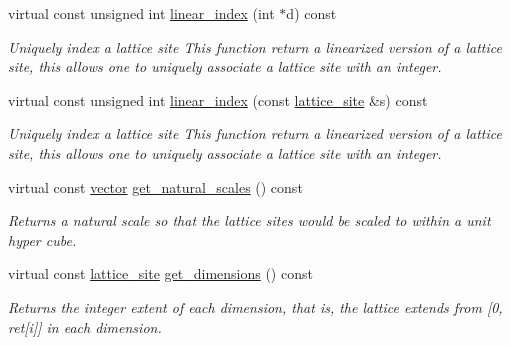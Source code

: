 \begin{DoxyCompactItemize}
\mbox{\label{classsisl_1_1cartesian__planar_a4ef0287f2ed519a497615049c3e564bf}} 
virtual const unsigned int \hyperlink{classsisl_1_1cartesian__planar_a4ef0287f2ed519a497615049c3e564bf}{linear\+\_\+index} (int $\ast$d) const
\begin{DoxyCompactList}\small\item\em Uniquely index a lattice site This function return a linearized version of a lattice site, this allows one to uniquely associate a lattice site with an integer. \end{DoxyCompactList}\item 
\mbox{\label{classsisl_1_1cartesian__planar_ae96d9421f8640e2fee5d269e9ef40db1}} 
virtual const unsigned int \hyperlink{classsisl_1_1cartesian__planar_ae96d9421f8640e2fee5d269e9ef40db1}{linear\+\_\+index} (const \hyperlink{namespacesisl_acd18feee4026583db6185df2b25434aa}{lattice\+\_\+site} \&s) const
\begin{DoxyCompactList}\small\item\em Uniquely index a lattice site This function return a linearized version of a lattice site, this allows one to uniquely associate a lattice site with an integer. \end{DoxyCompactList}\item 
\mbox{\label{classsisl_1_1cartesian__planar_a352301fc39d8766ff2705879828b4dd4}} 
virtual const \hyperlink{namespacesisl_a2069bd5374a9be042ff3ce3306d41e1a}{vector} \hyperlink{classsisl_1_1cartesian__planar_a352301fc39d8766ff2705879828b4dd4}{get\+\_\+natural\+\_\+scales} () const
\begin{DoxyCompactList}\small\item\em Returns a natural scale so that the lattice sites would be scaled to within a unit hyper cube. \end{DoxyCompactList}\item 
\mbox{\label{classsisl_1_1cartesian__planar_ab0dc277c7fc20bea7770c602d0157961}} 
virtual const \hyperlink{namespacesisl_acd18feee4026583db6185df2b25434aa}{lattice\+\_\+site} \hyperlink{classsisl_1_1cartesian__planar_ab0dc277c7fc20bea7770c602d0157961}{get\+\_\+dimensions} () const
\begin{DoxyCompactList}\small\item\em Returns the integer extent of each dimension, that is, the lattice extends from \mbox{[}0, ret\mbox{[}i\mbox{]}\mbox{]} in each dimension. \end{DoxyCompactList}\item 

\end{DoxyCompactItemize}
